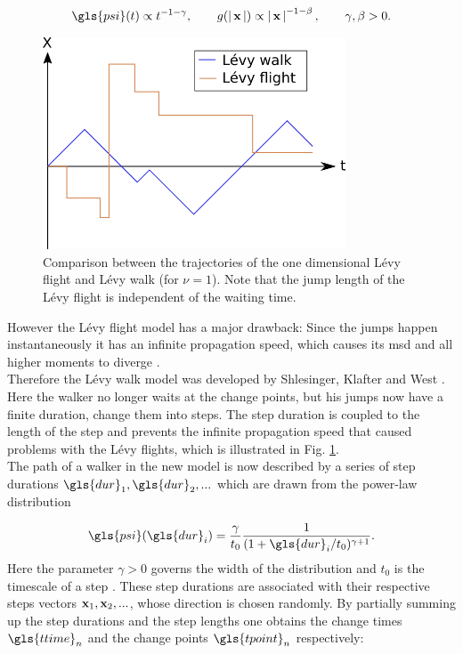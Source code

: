 \begin{align}
\gls{psi}(t) \propto t^{-1-\gamma}, \qquad g(\abs{\ve{x}}) \propto \abs{\ve{x}}^{-1-\beta}, \qquad \gamma, \beta > 0.
\end{align} 
%
\begin{figure}
\begin{center}
\includegraphics[width=90mm]{pics/levyFlight.png}
\caption{Comparison between the trajectories of the one dimensional L\'evy flight and L\'evy walk (for $\nu=1$). Note that the jump length of the L\'evy flight is independent of the waiting time. 
\label{fig:levyFlight}}
\end{center}
\end{figure}
%
However the L\'evy flight model has a major drawback: Since the jumps happen instantaneously it has an infinite propagation speed, which causes its \gls{msd} and all higher moments to diverge \cite{lwreview}. \\


Therefore the L\'evy walk model was developed by Shlesinger, Klafter and West \cite{shlesinger1987}. Here the walker no longer waits at the change points, but his jumps now have a finite duration, change them into steps. The step duration is coupled to the length of the step and prevents the infinite propagation speed that caused problems with the L\'evy flights, which is illustrated in Fig. \ref{fig:levyFlight}. \\

The path of a walker in the new model is now described by a series of step durations $\gls{dur}_1, \gls{dur}_2, ...$ which are drawn from the power-law distribution 

\begin{align}
\gls{psi}(\gls{dur}_i) = \frac{\gamma}{t_0} \frac{1}{(1+\gls{dur}_i/t_0)^{\gamma+1}} .
\label{eqn:defPsiT}
\end{align}
%
Here the parameter $\gamma>0$ governs the width of the distribution and { \color{red}$t_0$ is the timescale of a step }. These step durations are associated with their respective steps vectors $\mathbf{ x }_1, \mathbf{ x }_2, ...$, whose direction is chosen randomly. By partially summing up the step durations and the step lengths one obtains the change times $\gls{ttime}_n$ and the change points $\gls{tpoint}_n$ respectively:

